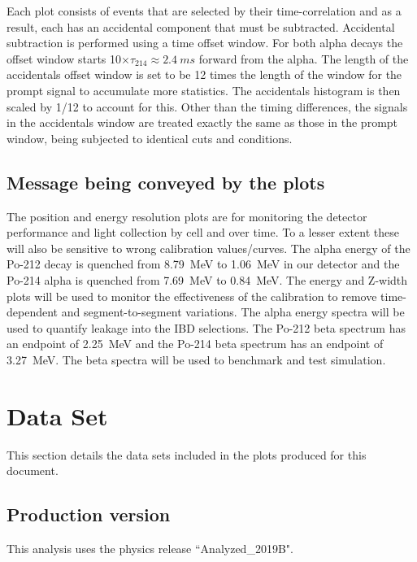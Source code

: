 Each plot consists of events that are selected by their time-correlation and as a result, each has an accidental component that must be subtracted. Accidental subtraction is performed using a time offset window. For both alpha decays the offset window starts 10$\times\tau_{214}\approx2.4~ms$ forward from the alpha. The length of the accidentals offset window is set to be 12 times the length of the window for the prompt signal to accumulate more statistics. The accidentals histogram is then scaled by 1/12 to account for this. Other than the timing differences, the signals in the accidentals window are treated exactly the same as those in the prompt window, being subjected to identical cuts and conditions.

\subsection{Message being conveyed by the plots}
The position and energy resolution plots are for monitoring the detector performance and light collection by cell and over time. To a lesser extent these will also be sensitive to wrong calibration values/curves. The alpha energy of the Po-212 decay is quenched from 8.79~MeV to 1.06~MeV in our detector and the Po-214 alpha is quenched from 7.69~MeV to 0.84~MeV. The energy and Z-width plots will be used to monitor the effectiveness of the calibration to remove time-dependent and segment-to-segment variations. The alpha energy spectra will be used to quantify leakage into the IBD selections. The Po-212 beta spectrum has an endpoint of 2.25~MeV and the Po-214 beta spectrum has an endpoint of 3.27~MeV. The beta spectra will be used to benchmark and test simulation.

\section{Data Set}
This section details the data sets included in the plots produced for this document.
\subsection{Production version}
This analysis uses the physics release ``Analyzed\_2019B".
